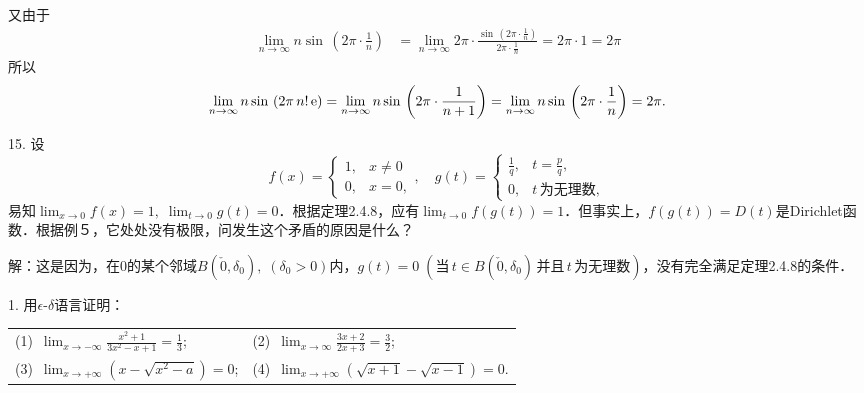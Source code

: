 又由于
\begin{align}
    \lim_{n \to \infty} n \sin \, \left(2 \pi \cdot \displaystyle\frac{1}{n}\right) &= \lim_{n \to \infty} 2 \pi \cdot \displaystyle\frac{\sin \, \left(2\pi \cdot \displaystyle\frac{1}{n}\right)}{2 \pi \cdot \displaystyle\frac{1}{n}} = 2 \pi \cdot 1 = 2 \pi
\end{align}
所以
\begin{equation}
    \lim_{n \to \infty} n \sin \, \left(2 \pi \, n! \, \mathrm{e} \right) = \lim_{n \to \infty} n \sin \, \left(2 \pi \cdot \displaystyle\frac{1}{n+1}\right) = \lim_{n \to \infty} n \sin \, \left(2 \pi \cdot \displaystyle\frac{1}{n}\right) = 2 \pi .
\end{equation}

15. 设
\begin{equation}
    f(x) = \begin{cases}
        1, & x \neq 0 \\
        0, & x = 0,
    \end{cases}, \quad g(t) = \begin{cases}
        \displaystyle\frac{1}{q}, & t = \displaystyle\frac{p}{q}, \\
        0, & t \, \text{为无理数},
    \end{cases}
\end{equation}
易知$\displaystyle\lim_{x \to 0} f(x) = 1, \; \displaystyle\lim_{t \to 0} g(t) = 0$．根据定理2.4.8，应有$\displaystyle\lim_{t \to 0} f(g(t)) = 1$．但事实上，$f(g(t)) = D(t)$是Dirichlet函数．根据例５，它处处没有极限，问发生这个矛盾的原因是什么？

解：这是因为，在$0$的某个邻域$B(\check{0}, \delta_0), \; (\delta_0 > 0)$内，$g(t) = 0 \; (\text{当} \, t \in B(\check{0}, \delta_0) \, \text{并且} \, t \, \text{为无理数})$，没有完全满足定理2.4.8的条件．

\exercise

1. 用$\epsilon$-$\delta$语言证明：
\begin{table}[H]
    \centering
    \begin{tabularx}{\textwidth} {  >{\raggedright\arraybackslash}X >{\raggedright\arraybackslash}X  }
       (1)~$\displaystyle\lim_{x \to -\infty} \displaystyle\frac{x^2+1}{3x^2-x+1}=\displaystyle\frac{1}{3}$; & (2)~$\displaystyle\lim_{x \to \infty} \displaystyle\frac{3x+2}{2x+3} = \displaystyle\frac{3}{2}$; \\ [1em]
       (3)~$\displaystyle\lim_{x \to +\infty} (x - \sqrt{x^2-a}) = 0$; & (4)~$\displaystyle\lim_{x \to +\infty} (\sqrt{x+1}-\sqrt{x-1}) = 0$.
    \end{tabularx}
\end{table}

